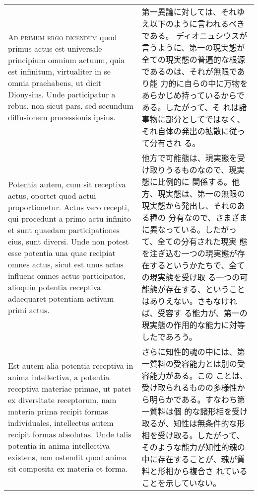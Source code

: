 \documentclass[paper=a4paper,fontsize=10pt,jafontsize=9pt,titlepage]{jlreq}
\begin{document}
\begin{longtable}{p{21em}p{21em}}
\\



{\scshape Ad primum ergo dicendum} quod primus actus est universale
principium omnium actuum, quia est infinitum, virtualiter in se omnia
praehabens, ut dicit Dionysius. Unde participatur a rebus, non sicut
pars, sed secundum diffusionem processionis ipsius. 



&

第一異論に対しては、それゆえ以下のように言われるべきである。
ディオニュシウスが言うように、第一の現実態が全ての現実態の普遍的な根源であるのは、それが無限であり能
 力的に自らの中に万物をあらかじめ持っているからである。したがって、そ
 れは諸事物に部分としてではなく、それ自体の発出の拡散に従って分有され
 る。

\\

Potentia autem, cum sit receptiva actus, oportet quod actui
proportionetur.  Actus vero recepti, qui procedunt a primo actu
infinito et sunt quaedam participationes eius, sunt diversi. Unde non
potest esse potentia una quae recipiat omnes actus, sicut est unus
actus influens omnes actus participatos, alioquin potentia receptiva
adaequaret potentiam activam primi actus.

&

他方で可能態は、現実態を受け取りうるものなので、現実態に比例的に
関係する。他方、現実態は、第一の無限の現実態から発出し、それのある種の
分有なので、さまざまに異なっている。したがって、全ての分有された現実
態を注ぎ込む一つの現実態が存在するというかたちで、全ての現実態を受け取
る一つの可能態が存在する、ということはありえない。さもなければ、受容す
る能力が、第一の現実態の作用的な能力に対等したであろう。


\\


Est autem alia potentia receptiva in anima intellectiva,
a potentia receptiva materiae primae, ut patet ex diversitate
receptorum, nam materia prima recipit formas individuales, intellectus
autem recipit formas absolutas. Unde talis potentia in anima
intellectiva existens, non ostendit quod anima sit composita ex
materia et forma.


&

さらに知性的魂の中には、第一質料の受容能力とは別の受容能力がある。この
ことは、受け取られるものの多様性から明らかである。すなわち第一質料は個
 的な諸形相を受け取るが、知性は無条件的な形相を受け取る。したがって、
 そのような能力が知性的魂の中に存在することが、魂が質料と形相から複合さ
 れていることを示していない。



\end{longtable}
\end{document}
